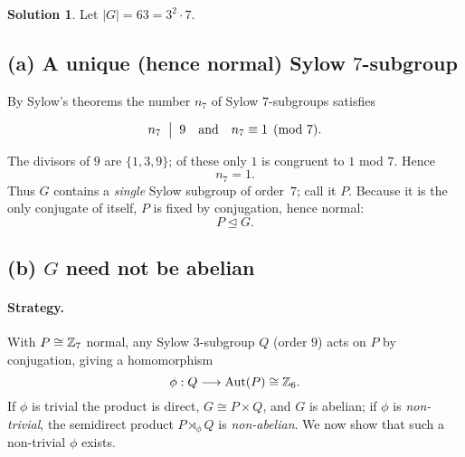 \documentclass[12pt]{article}
\theoremstyle{definition} %
\newtheorem{solution}{Solution}
\theoremstyle{plain} %
\begin{document}
          \begin{solution}
            Let $|G|=63=3^{2}\!\cdot 7$.
            
            \subsection*{(a)  A unique (hence normal) Sylow $7$-subgroup}
            
            By Sylow’s theorems the number $n_{7}$ of Sylow $7$-subgroups satisfies  
            
            \[
                 n_{7}\;\bigm|\;9
                 \quad\text{and}\quad
                 n_{7}\equiv 1\pmod{7}.
            \]
            
            The divisors of $9$ are $\{1,3,9\}$; of these only $1$ is congruent to
            $1$ mod $7$.  Hence  
            \[
                    n_{7}=1.
            \]
            Thus $G$ contains a \emph{single} Sylow subgroup of order~$7$; call it $P$.
            Because it is the only conjugate of itself, $P$ is fixed by conjugation,
            hence normal:
            \[
                    P \trianglelefteq G .
            \]
            
            \subsection*{(b)  $G$ need not be abelian}
            
            \paragraph{Strategy.}
            With $P\cong\Bbb Z_{7}$ normal, any Sylow $3$-subgroup $Q$ (order $9$)
            acts on $P$ by conjugation, giving a homomorphism
            \[
                    \phi : Q \longrightarrow \operatorname{Aut}(P)
                    \cong \Bbb Z_{6}.
            \]
            If $\phi$ is trivial the product is direct, $G\cong P\times Q$, and $G$
            is abelian; if $\phi$ is \emph{non-trivial}, the semidirect product
            $P\rtimes_{\phi} Q$ is \emph{non-abelian}.  We now show that such a
            non-trivial $\phi$ exists.
            

\end{solution}
\end{document}
